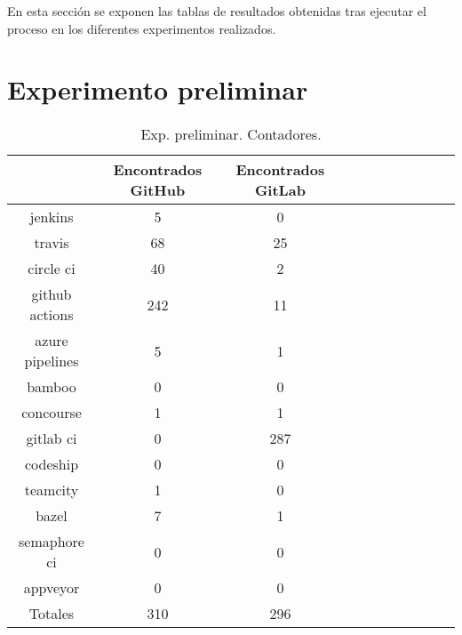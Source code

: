 En esta sección se exponen las tablas de resultados obtenidas tras ejecutar el proceso en los diferentes experimentos realizados.

\newpage

\section{Experimento preliminar}

\begin{table}[h!]
  \centering
  \caption{Exp. preliminar. Contadores.}
  \label{tab:tabla_p1}

\begin{footnotesize}
\renewcommand{\arraystretch}{1.5} %
\begin{tabular}{ccccccccccc}
  \hline
  {} &  Encontrados GitHub &  Encontrados GitLab \\
  \hline
  jenkins         &                   5 &                   0 \\
  travis          &                  68 &                  25 \\
  circle ci       &                  40 &                   2 \\
  github actions  &                 242 &                  11 \\
  azure pipelines &                   5 &                   1 \\
  bamboo          &                   0 &                   0 \\
  concourse       &                   1 &                   1 \\
  gitlab ci       &                   0 &                 287 \\
  codeship        &                   0 &                   0 \\
  teamcity        &                   1 &                   0 \\
  bazel           &                   7 &                   1 \\
  semaphore ci    &                   0 &                   0 \\
  appveyor        &                   0 &                   0 \\
  \hline
  Totales         &                 310 &                 296 \\
 \end{tabular}
\end{footnotesize}

\end{table}

